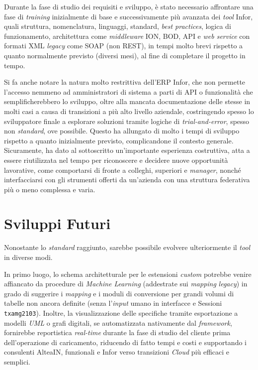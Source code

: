 Durante la fase di studio dei requisiti e sviluppo, è stato necessario affrontare una fase di \textit{training} inizialmente di base e successivamente più avanzata dei \textit{tool}
Infor, quali struttura, nomenclatura, linguaggi, standard, \textit{best practices}, logica di funzionamento, architettura come \textit{middleware} ION, BOD, API e \textit{web service}
con formati XML \textit{legacy} come SOAP (non REST), in tempi molto brevi rispetto a quanto normalmente previsto (diversi mesi), al fine
di completare il progetto in tempo.

Si fa anche notare la natura molto restrittiva dell'ERP Infor, che non permette l'accesso nemmeno ad amministratori di sistema
a parti di API o funzionalità che semplificherebbero lo sviluppo, oltre alla mancata documentazione delle stesse in molti casi
a causa di transizioni a più alto livello aziendale, costringendo spesso lo sviluppatore finale a esplorare
soluzioni tramite logiche di \textit{trial-and-error}, spesso non \textit{standard}, ove possibile.
Questo ha allungato di molto i tempi di sviluppo rispetto a quanto inizialmente previsto, complicandone il contesto generale.
Sicuramente, ha dato al sottoscritto un'importante esperienza costruttiva, atta a essere riutilizzata nel tempo per riconoscere
e decidere nuove opportunità lavorative, come comportarsi di fronte a colleghi, superiori e \textit{manager}, nonché interfacciarsi con
gli strumenti offerti da un'azienda con una struttura federativa più o meno complessa e varia.


\section{Sviluppi Futuri}\label{sec:sviluppi-futuri}
Nonostante lo \textit{standard} raggiunto, sarebbe possibile evolvere ulteriormente il \textit{tool} in diverse modi.

In primo luogo, lo schema architetturale per le estensioni \textit{custom} potrebbe venire affiancato da procedure di \textit{Machine Learning} (addestrate sui \textit{mapping} \textit{legacy})
in grado di suggerire i \textit{mapping} e i moduli di conversione per grandi volumi di tabelle non ancora definite
(senza l'\textit{input} umano in interfacce e Sessioni \texttt{txamg2103}).
Inoltre, la visualizzazione delle specifiche tramite esportazione
a modelli \textit{UML} o grafi digitali, se automatizzata nativamente dal \textit{framework}, fornirebbe reportistica \textit{real-time} durante
la fase di studio del cliente prima dell'operazione di caricamento, riducendo di fatto tempi e costi
e supportando i consulenti AlteaIN, funzionali e Infor verso transizioni \textit{Cloud} più efficaci e semplici.

